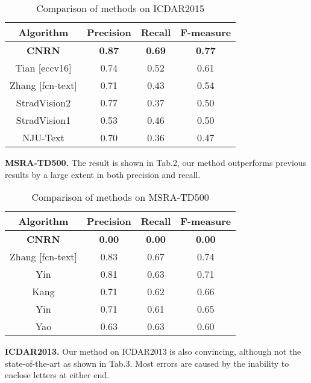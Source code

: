 \documentclass[10pt,twocolumn,letterpaper]{article}
\begin{document}
	\begin{table}
		\caption{Comparison of methods on ICDAR2015}
		\centering
		\begin{tabular}{|c|c|c|c|}
			\hline
			Algorithm & Precision & Recall & F-measure \\
			\hline
			\hline
			\textbf{CNRN} & \textbf{0.87} & \textbf{0.69} & \textbf{0.77} \\
			\hline
			Tian [eccv16] & 0.74 & 0.52 & 0.61 \\
			\hline
			Zhang [fcn-text] & 0.71 & 0.43 & 0.54 \\
			\hline
			StradVision2 & 0.77 & 0.37 & 0.50 \\
			\hline
			StradVision1 & 0.53 & 0.46 & 0.50 \\
			\hline
			NJU-Text & 0.70 & 0.36 & 0.47 \\
			\hline
		\end{tabular}
	\end{table}
	
	\noindent \textbf{MSRA-TD500.} The result is shown in Tab.2, our method outperforms previous results by a large extent in both precision and recall.
	
	\begin{table}
		\caption{Comparison of methods on MSRA-TD500}
		\centering
		\begin{tabular}{|c|c|c|c|}
			\hline
			Algorithm & Precision & Recall & F-measure \\
			\hline
			\hline
			\textbf{CNRN} & \textbf{0.00} & \textbf{0.00} & \textbf{0.00} \\
			\hline
			Zhang [fcn-text] & 0.83 & 0.67 & 0.74 \\
			\hline
			Yin & 0.81 & 0.63 & 0.71 \\ %
			\hline
			Kang & 0.71 & 0.62 & 0.66 \\ %
			\hline
			Yin & 0.71 & 0.61 & 0.65 \\ %
			\hline
			Yao & 0.63 & 0.63 & 0.60 \\ %
			\hline
		\end{tabular}
	\end{table}
	
	\noindent \textbf{ICDAR2013.} Our method on ICDAR2013 is also convincing, although not the state-of-the-art as shown in Tab.3. Most errors are caused by the inability to enclose letters at either end.
	
\end{document}
